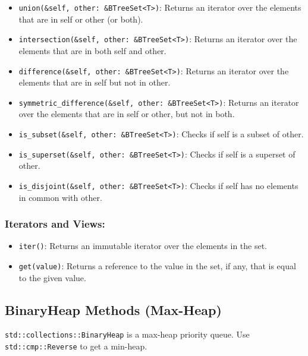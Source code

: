\documentclass[
  11pt,
]{article}
\providecommand{\tightlist}{%
  \setlength{\itemsep}{0pt}\setlength{\parskip}{0pt}}
\begin{document}
\begin{itemize}
\tightlist
\item
  \texttt{union(\&self,\ other:\ \&BTreeSet\textless{}T\textgreater{})}:
  Returns an iterator over the elements that are in self or other (or
  both).
\item
  \texttt{intersection(\&self,\ other:\ \&BTreeSet\textless{}T\textgreater{})}:
  Returns an iterator over the elements that are in both self and other.
\item
  \texttt{difference(\&self,\ other:\ \&BTreeSet\textless{}T\textgreater{})}:
  Returns an iterator over the elements that are in self but not in
  other.
\item
  \texttt{symmetric\_difference(\&self,\ other:\ \&BTreeSet\textless{}T\textgreater{})}:
  Returns an iterator over the elements that are in self or other, but
  not in both.
\item
  \texttt{is\_subset(\&self,\ other:\ \&BTreeSet\textless{}T\textgreater{})}:
  Checks if self is a subset of other.
\item
  \texttt{is\_superset(\&self,\ other:\ \&BTreeSet\textless{}T\textgreater{})}:
  Checks if self is a superset of other.
\item
  \texttt{is\_disjoint(\&self,\ other:\ \&BTreeSet\textless{}T\textgreater{})}:
  Checks if self has no elements in common with other.
\end{itemize}

\subsubsection{Iterators and Views:}\label{iterators-and-views-3}

\begin{itemize}
\tightlist
\item
  \texttt{iter()}: Returns an immutable iterator over the elements in
  the set.
\item
  \texttt{get(value)}: Returns a reference to the value in the set, if
  any, that is equal to the given value.
\end{itemize}

\subsection{BinaryHeap Methods
(Max-Heap)}\label{binaryheap-methods-max-heap}

\texttt{std::collections::BinaryHeap} is a max-heap priority queue. Use
\texttt{std::cmp::Reverse} to get a min-heap.
\end{document}
